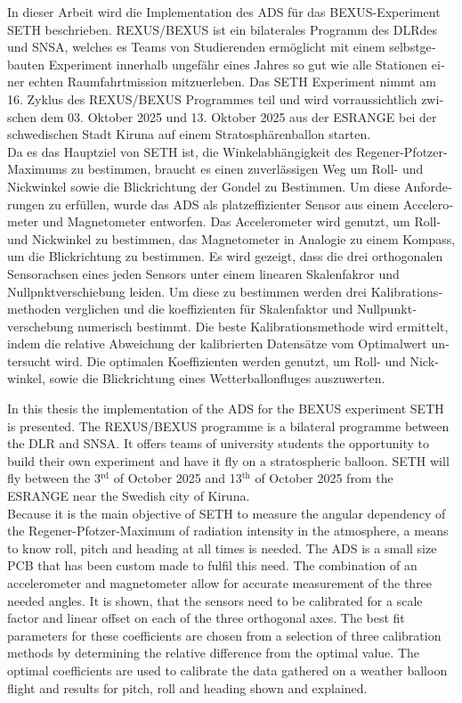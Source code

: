 \begin{otherlanguage}{ngerman}
In dieser Arbeit wird die Implementation des \acf{ADS} für das \ac{BEXUS}-Experiment \ac{SETH} beschrieben. \acs{REXUS/BEXUS} ist ein bilaterales Programm des \acfp{DLRde} und \acf{SNSA}, welches es Teams von Studierenden ermöglicht mit einem selbstgebauten Experiment innerhalb ungefähr eines Jahres so gut wie alle Stationen einer echten Raumfahrtmission mitzuerleben. Das \ac{SETH} Experiment nimmt am 16. Zyklus des \acs{REXUS}/\acs{BEXUS} Programmes teil und wird vorraussichtlich zwischen dem 03. Oktober 2025 und 13. Oktober 2025 aus der \ac{ESRANGE} bei der schwedischen Stadt Kiruna auf einem Stratosphärenballon starten.\\
Da es das Hauptziel von \ac{SETH} ist, die Winkelabhängigkeit des Regener-Pfotzer-Maximums zu bestimmen, braucht es einen zuverlässigen Weg um Roll- und Nickwinkel sowie die Blickrichtung der Gondel zu Bestimmen. Um diese Anforderungen zu erfüllen, wurde das \ac{ADS} als platzeffizienter Sensor aus einem Accelerometer und Magnetometer entworfen. Das Accelerometer wird genutzt, um Roll- und Nickwinkel zu bestimmen, das Magnetometer in Analogie zu einem Kompass, um die Blickrichtung zu bestimmen. Es wird gezeigt, dass die drei orthogonalen Sensorachsen eines jeden Sensors unter einem linearen Skalenfakror und Nullpnktverschiebung leiden. Um diese zu bestimmen werden drei Kalibrationsmethoden verglichen und die koeffizienten für Skalenfaktor und Nullpunktverschebung numerisch bestimmt. Die beste Kalibrationsmethode wird ermittelt, indem die relative Abweichung der kalibrierten Datensätze vom Optimalwert untersucht wird. Die optimalen Koeffizienten werden genutzt, um Roll- und Nickwinkel, sowie die Blickrichtung eines Wetterballonfluges auszuwerten.
\end{otherlanguage}

In this thesis the implementation of the \acf{ADS} for the \acf{BEXUS} experiment \acf{SETH} is presented. The \acs{REXUS/BEXUS} programme is a bilateral programme between the \acf{DLR} and \acf{SNSA}. It offers teams of university students the opportunity to build their own experiment and have it fly on a stratospheric balloon. \ac{SETH} will fly between the 3$^\mathrm{rd}$ of October 2025 and 13$^\mathrm{th}$ of October 2025 from the \acf{ESRANGE} near the Swedish city of Kiruna.\\ Because it is the main objective of \ac{SETH} to measure the angular dependency of the Regener-Pfotzer-Maximum of radiation intensity in the atmosphere, a means to know roll, pitch and heading at all times is needed. The \ac{ADS} is a small size \acs{PCB} that has been custom made to fulfil this need. The combination of an accelerometer and magnetometer allow for accurate measurement of the three needed angles. It is shown, that the sensors need to be calibrated for a scale factor and linear offset on each of the three orthogonal axes. The best fit parameters for these coefficients are chosen from a selection of three calibration methods by determining the relative difference from the optimal value. The optimal coefficients are used to calibrate the data gathered on a weather balloon flight and results for pitch, roll and heading shown and explained.